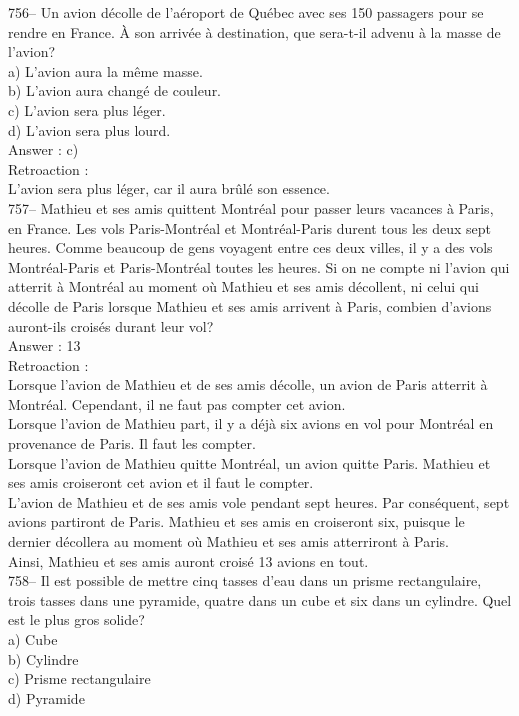 ﻿\documentclass[letterpaper, 12pt]{article}
\begin{document}
756-- Un avion d\'ecolle de l'a\'eroport de Qu\'ebec avec ses 150 passagers
pour se rendre en France.  \`A son arriv\'ee \`a destination, que sera-t-il
advenu \`a la masse de l'avion?\\
a) L'avion aura la m\^eme masse.\\
b) L'avion aura chang\'e de couleur.\\
c) L'avion sera plus l\'eger.\\
d) L'avion sera plus lourd.\\

Answer : c)\\

Retroaction : \\
L'avion sera plus l\'eger, car il aura br\^ul\'e son essence.\\

757-- Mathieu et ses amis quittent Montr\'eal pour passer leurs vacances \`a
Paris, en France.  Les vols Paris-Montr\'eal et Montr\'eal-Paris durent tous
les deux sept heures.  Comme beaucoup de gens voyagent entre ces deux
villes, il y a des vols Montr\'eal-Paris et Paris-Montr\'eal toutes les
heures.  Si on ne compte ni l'avion qui atterrit \`a Montr\'eal au moment
o\`u Mathieu et ses amis d\'ecollent, ni celui qui d\'ecolle de Paris
lorsque Mathieu et ses amis arrivent \`a Paris, combien d'avions auront-ils
crois\'es durant leur vol?\\

Answer : 13\\

Retroaction : \\
Lorsque l'avion de Mathieu et de ses amis d\'ecolle, un avion de Paris
atterrit \`a Montr\'eal. Cependant, il ne faut pas compter cet avion.\\
Lorsque l'avion de Mathieu part, il y a d\'ej\`a six avions en vol pour
Montr\'eal en provenance de Paris.  Il faut les compter.\\
Lorsque l'avion de Mathieu quitte Montr\'eal, un avion quitte Paris.
Mathieu et ses amis croiseront cet avion et il faut le compter.\\
L'avion de Mathieu et de ses amis vole pendant sept heures.  Par
cons\'equent, sept avions partiront de Paris.  Mathieu et ses amis en
croiseront six, puisque le dernier d\'ecollera au moment o\`u Mathieu et ses
amis atterriront \`a Paris.\\
Ainsi, Mathieu et ses amis auront crois\'e 13 avions en tout.  \\

758-- Il est possible de mettre cinq tasses d'eau dans un prisme
rectangulaire, trois tasses dans une pyramide, quatre dans un cube et six
dans un cylindre.  Quel est le plus gros solide?\\
a) Cube\\
b) Cylindre\\
c) Prisme rectangulaire\\
d) Pyramide\\
\end{document}
